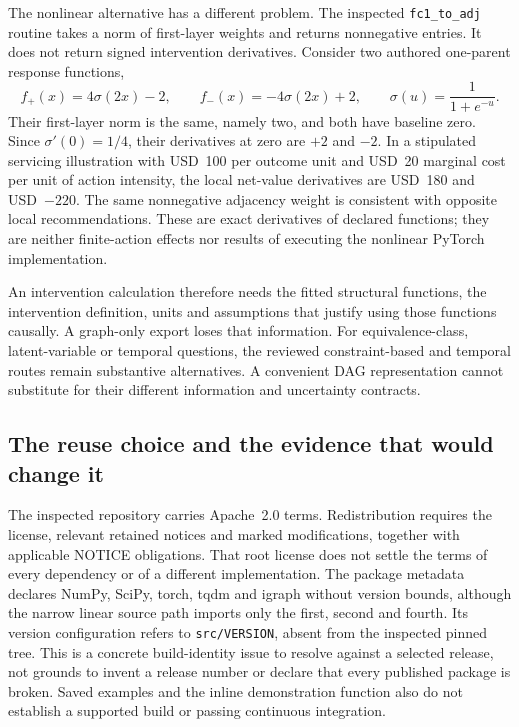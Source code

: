 The nonlinear alternative has a different problem. The inspected
\texttt{fc1\_to\_adj} routine takes a norm of first-layer weights and returns
nonnegative entries. It does not return signed intervention derivatives.
Consider two authored one-parent response functions,
\begin{equation}
 f_+(x)=4\sigma(2x)-2,\qquad
 f_-(x)=-4\sigma(2x)+2,\qquad
 \sigma(u)=\frac{1}{1+e^{-u}}.
\end{equation}
Their first-layer norm is the same, namely two, and both have baseline zero.
Since $\sigma'(0)=1/4$, their derivatives at zero are $+2$ and $-2$.
In a stipulated servicing illustration with USD~100 per outcome unit and
USD~20 marginal cost per unit of action intensity, the local net-value
derivatives are USD~180 and USD~$-220$. The same nonnegative adjacency
weight is consistent with opposite local recommendations. These are exact
derivatives of declared functions; they are neither finite-action effects
nor results of executing the nonlinear PyTorch implementation.
\citep{exec16_dagma_primary,exec16_dagma_exact}

An intervention calculation therefore needs the fitted structural functions,
the intervention definition, units and assumptions that justify using those
functions causally. A graph-only export loses that information. For
equivalence-class, latent-variable or temporal questions, the reviewed
constraint-based and temporal routes remain substantive alternatives. A
convenient DAG representation cannot substitute for their different
information and uncertainty contracts.

\subsection{The reuse choice and the evidence that would change it}

The inspected repository carries Apache~2.0 terms. Redistribution requires
the license, relevant retained notices and marked modifications, together
with applicable NOTICE obligations. That root license does not settle the
terms of every dependency or of a different implementation. The package
metadata declares NumPy, SciPy, torch, tqdm and igraph without version bounds,
although the narrow linear source path imports only the first, second and
fourth. Its version configuration refers to \texttt{src/VERSION}, absent
from the inspected pinned tree. This is a concrete build-identity issue to
resolve against a selected release, not grounds to invent a release number
or declare that every published package is broken. Saved examples and the
inline demonstration function also do not establish a supported build or
passing continuous integration.
\citep{exec16_dagma_primary}

